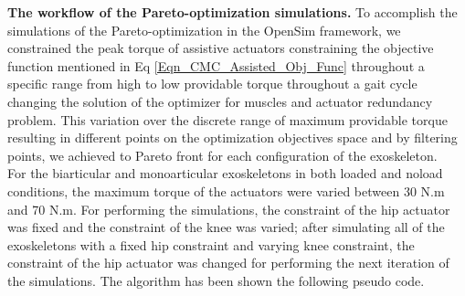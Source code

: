 \documentclass[10pt,letterpaper]{article}
\begin{document}
\textbf{The workflow of the Pareto-optimization simulations.} To accomplish the simulations of the Pareto-optimization in the OpenSim framework, we constrained the peak torque of assistive actuators constraining the objective function mentioned in Eq \ref{Eqn_CMC_Assisted_Obj_Func} throughout a specific range from high to low providable torque throughout a gait cycle changing the solution of the optimizer for muscles and actuator redundancy problem. This variation over the discrete range of maximum providable torque resulting in different points on the optimization objectives space and by filtering points, we achieved to Pareto front for each configuration of the exoskeleton.\\
For the biarticular and monoarticular exoskeletons in both loaded and noload conditions, the maximum torque of the actuators were varied between 30 N.m and 70 N.m. For performing the simulations, the constraint of the hip actuator was fixed and the constraint of the knee was varied; after simulating all of the exoskeletons with a fixed hip constraint and varying knee constraint, the constraint of the hip actuator was changed for performing the next iteration of the simulations. The algorithm has been shown the following pseudo code.\\
\end{document}
